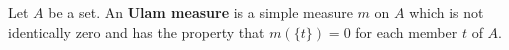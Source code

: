 Let $A$ be a set. An \textbf{Ulam measure} is a simple measure $m$ on $A$ which is not identically zero and has the property that $m(\{t\}) = 0$ for each member $t$ of $A$.
